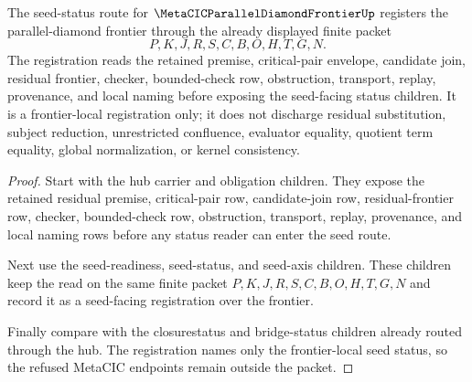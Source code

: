 \begin{theorem}
\label{thm:metacic-parallel-diamond-frontier-seed-status-frontier-registration}
The seed-status route for $\MetaCICParallelDiamondFrontierUp$ registers the parallel-diamond frontier through the already displayed finite packet
$$
P,K,J,R,S,C,B,O,H,T,G,N .
$$
The registration reads the retained premise, critical-pair envelope, candidate join, residual frontier, checker, bounded-check row, obstruction, transport, replay, provenance, and local naming before exposing the seed-facing status children. It is a frontier-local registration only; it does not discharge residual substitution, subject reduction, unrestricted confluence, evaluator equality, quotient term equality, global normalization, or kernel consistency.
\end{theorem}
\begin{proof}
Start with the hub carrier and obligation children. They expose the retained residual premise, critical-pair row, candidate-join row, residual-frontier row, checker, bounded-check row, obstruction, transport, replay, provenance, and local naming rows before any status reader can enter the seed route.

Next use the seed-readiness, seed-status, and seed-axis children. These children keep the read on the same finite packet $P,K,J,R,S,C,B,O,H,T,G,N$ and record it as a seed-facing registration over the frontier.

Finally compare with the closurestatus and bridge-status children already routed through the hub. The registration names only the frontier-local seed status, so the refused MetaCIC endpoints remain outside the packet.
\end{proof}
